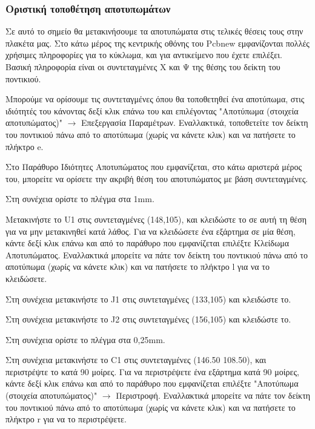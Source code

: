 \documentclass[a4paper]{article}
\begin{document}
\subsubsection{Οριστική τοποθέτηση αποτυπωμάτων}

Σε αυτό το σημείο θα μετακινήσουμε τα αποτυπώματα στις τελικές θέσεις τους στην πλακέτα μας. Στο κάτω μέρος της κεντρικής οθόνης του \textenglish{Pcbnew} εμφανίζονται πολλές χρήσιμες πληροφορίες για το κύκλωμα, και για αντικείμενο που έχετε επιλέξει. Βασική πληροφορία είναι οι συντεταγμένες Χ και Ψ της θέσης του δείκτη του ποντικιού.

Μπορούμε να ορίσουμε τις συντεταγμένες όπου θα τοποθετηθεί ένα αποτύπωμα, στις ιδιότητές του κάνοντας δεξί κλικ επάνω του και επιλέγοντας "Αποτύπωμα (στοιχεία αποτυπώματος)" $\rightarrow$ Επεξεργασία Παραμέτρων. Εναλλακτικά, τοποθετείτε τον δείκτη του ποντικιού πάνω από το αποτύπωμα (χωρίς να κάνετε κλικ) και να πατήσετε το πλήκτρο e.

Στο Παράθυρο Ιδιότητες Αποτυπώματος που εμφανίζεται, στο κάτω αριστερά μέρος του, μπορείτε να ορίσετε την ακριβή θέση του αποτυπώματος με βάση συντεταγμένες.

\begin{figure}
  \begin{center}
    \label{fig:kicad-main}
  \end{center}
\end{figure}


Στη συνέχεια ορίστε το πλέγμα στα 1mm.

Μετακινήστε το U1 στις συντεταγμένες (148,105), και κλειδώστε το σε αυτή τη θέση για να μην μετακινηθεί κατά λάθος. Για να κλειδώσετε ένα εξάρτημα σε μία θέση, κάντε δεξί κλικ επάνω και από το παράθυρο που εμφανίζεται επιλέξτε Κλείδωμα Αποτυπώματος. Εναλλακτικά μπορείτε να πάτε τον δείκτη του ποντικιού πάνω από το αποτύπωμα (χωρίς να κάνετε κλικ) και να πατήσετε το πλήκτρο l για να το κλειδώσετε.

Στη συνέχεια μετακινήστε το J1 στις συντεταγμένες (133,105) και κλειδώστε το.

Στη συνέχεια μετακινήστε το J2 στις συντεταγμένες (156,105) και κλειδώστε το.

Στη συνέχεια ορίστε το πλέγμα στα 0,25mm.

Στη συνέχεια μετακινήστε το C1 στις συντεταγμένες (146.50 108.50), και περιστρέψτε το κατά 90 μοίρες.  Για να περιστρέψετε ένα εξάρτημα κατά 90 μοίρες, κάντε δεξί κλικ επάνω και από το παράθυρο που εμφανίζεται επιλέξτε "Αποτύπωμα (στοιχεία αποτυπώματος)" $\rightarrow$ Περιστροφή. Εναλλακτικά μπορείτε να πάτε τον δείκτη του ποντικιού πάνω από το αποτύπωμα (χωρίς να κάνετε κλικ) και να πατήσετε το πλήκτρο r για να το περιστρέψετε.
\end{document}
